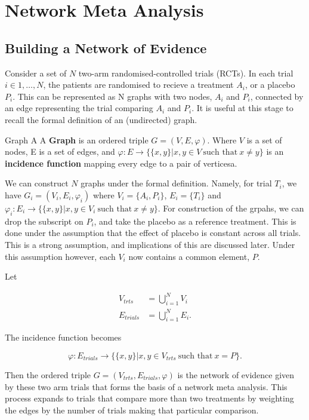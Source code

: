 \chapter{Network Meta Analysis}

\section{Building a Network of Evidence}

Consider a set of $N$ two-arm randomised-controlled trials (RCTs). In each trial $i \in 1,\ldots,N$, the patients are randomised to recieve a treatment $A_i$, or a placebo $P_i$. This can be represented as N graphs with two nodes, $A_i$ and $P_i$, connected by an edge representing the trial comparing $A_i$ and $P_i$. It is useful at this stage to recall the formal definition of an (undirected) graph. 

\begin{definition}{Graph}
A  A \textbf{Graph} is an ordered triple $G = (V, E, \varphi)$. Where  $V$ is a set of nodes, E is a set  of edges, and $\varphi : E \to \{\{ x, y \} | x, y \in V \ \text{such that} \ x \neq y \}$ is an  \textbf{incidence function} mapping every edge to a pair of verticesa.
\end{definition}

We can construct $N$ graphs under the formal definition. Namely, for trial $T_i$, we have $G_i = (V_i, E_i, \varphi_i)$ where $V_i = \{ A_i, P_i \}$, $E_i = \{T_i\}$ and $\varphi_i : E_i \to \{ \{ x, y \} | x, y \in V_i \ \text{such that} \  x \neq y \}$. For construction of the grpahs, we can drop the subscript on $P_i$, and take the placebo as a reference treatment. This is done under the assumption that the effect of placebo is constant across all trials. This is a strong assumption, and implications of this are discussed later. Under this assumption however, each $V_i$ now contains a common element, $P$.

Let

\begin{align*}
    V_{trts} &= \bigcup_{i=1}^{N} V_i \\
    E_{trials} &= \bigcup_{i=1}^{N} E_i
.\end{align*}

The incidence function becomes 

\[
    \varphi : E_{trials} \to \{ \{x, y \} | x, y \in V_{trts} \ \text{such that} \ x = P \}
.\] 

Then the ordered triple $G = (V_{trts}, E_{trials}, \varphi)$ is the network of evidence given by these two arm trials that forms the basis of a network meta analysis. This process expands to trials that compare more than two treatments by weighting the edges by the number of trials making that particular comparison.

